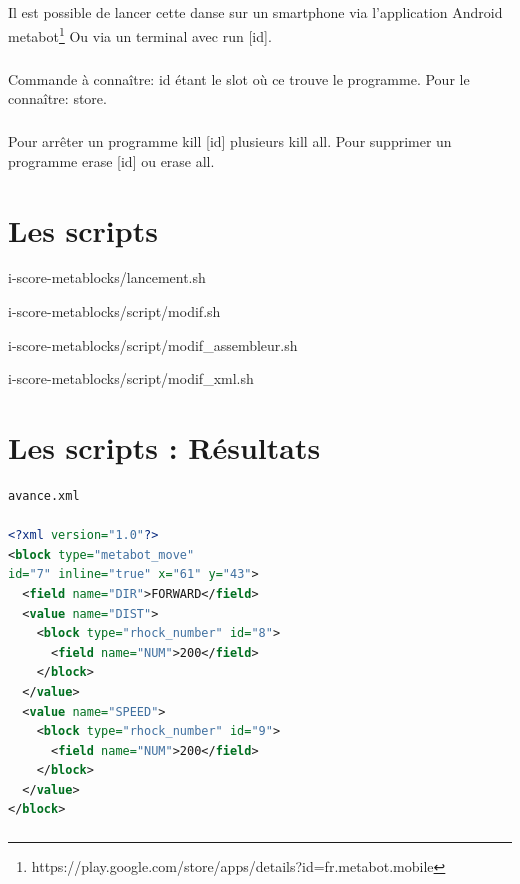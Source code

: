 \documentclass[10pt,a4paper]{report}
\begin{document}
\begin{appendices}
\paragraph{}
Il est possible de lancer cette danse sur un smartphone via l'application Android metabot\footnote{https://play.google.com/store/apps/details?id=fr.metabot.mobile} Ou via un terminal avec run [id].
\paragraph{}
Commande à connaître:
id étant le slot où ce trouve le programme. Pour le connaître: store.
\paragraph{}
Pour arrêter un programme kill [id] plusieurs kill all. Pour supprimer un programme erase [id] ou erase all.

\chapter{Les scripts} 

{i-score-metablocks/lancement.sh}
\newpage

{i-score-metablocks/script/modif.sh}


{i-score-metablocks/script/modif_assembleur.sh}


{i-score-metablocks/script/modif_xml.sh}

\chapter{Les scripts : Résultats} 
\begin{lstlisting}[language=xml, frame=none]
avance.xml

<?xml version="1.0"?>
<block type="metabot_move" 
id="7" inline="true" x="61" y="43">
  <field name="DIR">FORWARD</field>
  <value name="DIST">
    <block type="rhock_number" id="8">
      <field name="NUM">200</field>
    </block>
  </value>
  <value name="SPEED">
    <block type="rhock_number" id="9">
      <field name="NUM">200</field>
    </block>
  </value>
</block>
\end{lstlisting}
\paragraph{}


\end{appendices}
\end{document}
